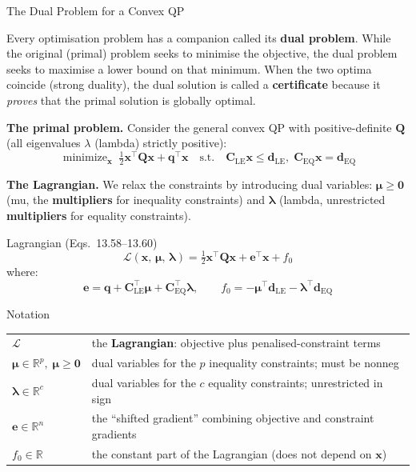 \documentclass[aspectratio=169,10pt]{beamer}
\DeclareMathOperator*{\minimize}{minimize}
\newcommand{\bx}{\mathbf{x}}
\newcommand{\bq}{\mathbf{q}}
\newcommand{\bC}{\mathbf{C}}
\newcommand{\bd}{\mathbf{d}}
\newcommand{\bQ}{\mathbf{Q}}
\newcommand{\bmu}{\boldsymbol{\mu}}
\newcommand{\blambda}{\boldsymbol{\lambda}}
\newcommand{\R}{\mathbb{R}}
\begin{document}
\begin{frame}[allowframebreaks]{The Dual Problem for a Convex QP}

  Every optimisation problem has a companion called its \textbf{dual problem}.
  While the original (primal) problem seeks to minimise the objective, the dual
  problem seeks to maximise a lower bound on that minimum.  When the two optima
  coincide (strong duality), the dual solution is called a \textbf{certificate}
  because it \emph{proves} that the primal solution is globally optimal.

  \textbf{The primal problem.}  Consider the general convex QP with positive-definite
  $\bQ$ (all eigenvalues $\lambda$ (lambda) strictly positive):
  \[
    \minimize_{\bx}\; \tfrac{1}{2}\bx^{\top}\bQ\bx + \bq^{\top}\bx
    \quad \text{s.t.}\quad \bC_{\text{LE}}\bx \leq \bd_{\text{LE}},\;
    \bC_{\text{EQ}}\bx = \bd_{\text{EQ}}
  \]

  \textbf{The Lagrangian.}  We relax the constraints by introducing dual variables:
  $\bmu \geq \mathbf{0}$ (mu, the \textbf{multipliers} for inequality constraints)
  and $\blambda$ (lambda, unrestricted \textbf{multipliers} for equality constraints).

  \begin{block}{Lagrangian (Eqs.~13.58--13.60)}
    \[
      \mathcal{L}(\bx,\, \bmu,\, \blambda)
      = \tfrac{1}{2}\bx^{\top}\bQ\bx + \mathbf{e}^{\top}\bx + f_0
    \]
    where:
    \[
      \mathbf{e} = \bq + \bC_{\text{LE}}^{\top}\bmu + \bC_{\text{EQ}}^{\top}\blambda,
      \qquad
      f_0 = -\bmu^{\top}\bd_{\text{LE}} - \blambda^{\top}\bd_{\text{EQ}}
    \]
  \end{block}

  \begin{block}{Notation}
    \begin{tabular}{ll}
      $\mathcal{L}$ & the \textbf{Lagrangian}: objective plus penalised-constraint terms\\
      $\bmu \in \R^p,\; \bmu \geq \mathbf{0}$ & dual variables for the $p$ inequality constraints; must be nonneg\\
      $\blambda \in \R^c$ & dual variables for the $c$ equality constraints; unrestricted in sign\\
      $\mathbf{e} \in \R^n$ & the ``shifted gradient'' combining objective and constraint gradients\\
      $f_0 \in \R$ & the constant part of the Lagrangian (does not depend on $\bx$)\\
    \end{tabular}
  \end{block}


\end{frame}
\end{document}
